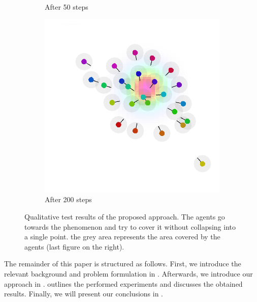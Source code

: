 \documentclass[conference]{IEEEtran}
\begin{document}
\begin{figure}[t]
\begin{subfigure}[b]{0.32\linewidth}
		\caption{After 50 steps}
		\label{fig:after}
	\end{subfigure}
	\begin{subfigure}[b]{0.32\linewidth}
		\includegraphics[width=\textwidth]{imgs/end.png}
		\caption{After 200 steps}
		\label{fig:end}
	\end{subfigure}
	\caption{Qualitative test results of the proposed approach. 
		The agents go towards the phenomenon and try to cover it without collapsing into a single point.
		the grey area represents the area covered by the agents (last figure on the right).}
	\label{fig:simulations}
\end{figure}

The remainder of this paper is structured as follows. 
 First, we introduce the relevant background and problem formulation in . 
 Afterwards, we introduce our approach in . 
  outlines the performed experiments and discusses the obtained results. 
 Finally, we will present our conclusions in .
\end{document}
